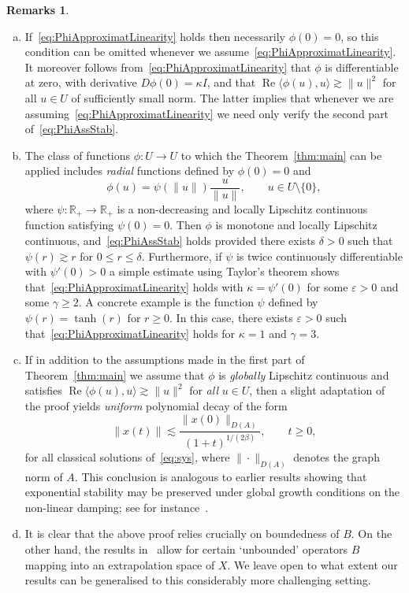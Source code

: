 \documentclass[11pt, a4paper]{amsart}
\DeclareMathOperator*{\R}{Re}
\newcommand{\ep}{\varepsilon}
\newcommand{\RR}{\mathbb{R}}
\theoremstyle{definition}
\newtheorem{rems}[thm]{Remarks}
\numberwithin{equation}{section}
\begin{document}
\begin{rems}
\begin{enumerate}[(a)]
\item If~\eqref{eq:PhiApproximatLinearity} holds then necessarily $\phi(0)=0$, so this condition can be omitted whenever  we assume~\eqref{eq:PhiApproximatLinearity}. It moreover follows from~\eqref{eq:PhiApproximatLinearity} that $\phi$ is differentiable at zero, with derivative $D\phi(0)=\kappa I$, and that $\R\langle\phi(u),u\rangle\gtrsim\|u\|^2$ for all $u\in U$ of sufficiently small norm. The latter implies that whenever we are assuming~\eqref{eq:PhiApproximatLinearity} we need only verify the second part of~\eqref{eq:PhiAssStab}.
\item The class of functions $\phi\colon U\to U$ to which the Theorem~\ref{thm:main} can be applied includes \emph{radial} functions defined by  $\phi(0)=0$ and 
$$\phi(u)=\psi(\|u\|)\frac{u}{\|u\|},\qquad u\in U\setminus\{0\},$$
 where $\psi\colon\RR_+\to\RR_+$ is a non-decreasing and locally Lipschitz continuous function satisfying $\psi(0)=0$. Then $\phi$ is monotone and locally Lipschitz continuous, and~\eqref{eq:PhiAssStab} holds provided there exists $\delta>0$ such that $\psi(r)\gtrsim r$ for  $0\le r\le\delta$. Furthermore, if $\psi$ is twice continuously differentiable with $\psi'(0)>0$ a simple estimate using Taylor's theorem shows that~\eqref{eq:PhiApproximatLinearity} holds with $\kappa=\psi'(0)$ for some $\ep>0$ and some $\gamma\ge2$. A concrete example is the function $\psi$ defined by $\psi(r)=\tanh(r)$ for $r\ge0$. In this case, there exists $\ep>0$ such that~\eqref{eq:PhiApproximatLinearity} holds for $\kappa=1$ and $\gamma=3$.
\item If in addition to the assumptions made in the first part of Theorem~\ref{thm:main} we assume that $\phi$ is \emph{globally} Lipschitz continuous and satisfies $\R\langle\phi(u),u\rangle\gtrsim  \|u\|^2$ for \emph{all} $u\in U$, then a slight adaptation of the proof yields \emph{uniform} polynomial decay of the form 
$$\|x(t)\| \lesssim \frac{\|x(0)\|_{D(A)}}{(1+t)^{1/(2\beta)}} , \qquad t\ge 0,$$
for all classical solutions of~\eqref{eq:sys}, where $\|\cdot\|_{D(A)}$ denotes the graph norm of $A$.
This conclusion is analogous to earlier results showing that exponential stability may be preserved  under global
growth conditions on the non-linear damping; see for instance~\cite{LasTat93}.
\item It is clear that the above proof relies crucially on boundedness of $B$. On the other hand, the results in~\cite{Ala05, AmmTuc01, ChiPau23} allow for certain `unbounded' operators $B$ mapping into an extrapolation space of $X$. We leave open to what extent our results can be generalised to this considerably more challenging setting.
\end{enumerate}
\end{rems}
\end{document}
